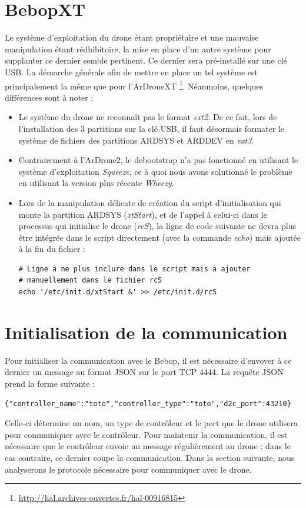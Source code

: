 \documentclass[12pt, openany]{report}
\begin{document}
\section{BebopXT}
Le système d'exploitation du drone étant propriétaire et une mauvaise manipulation étant rédhibitoire, la mise en place d'un autre système pour supplanter ce dernier semble pertinent. Ce dernier sera pré-installé sur une clé USB. 
La démarche générale afin de mettre en place un tel système est principalement la même que pour l'ArDroneXT \footnote{\url{http://hal.archives-ouvertes.fr/hal-00916815}}. Néanmoins, quelques différences sont à noter :
\begin{itemize}
\item Le système du drone ne reconnaît pas le format \textit{ext2}. De ce fait, lors de l'installation des 3 partitions sur la clé USB, il faut désormais formater le système de fichiers des partitions ARDSYS et ARDDEV en \textit{ext3}.
\item Contrairement à l'ArDrone2, le debootstrap n'a pas fonctionné en utilisant le système d'exploitation \textit{Squeeze}, ce à quoi nous avons solutionné le problème en utilisant la version plus récente \textit{Wheezy}.
\item Lors de la manipulation délicate de création du script d'initialisation qui monte la partition ARDSYS (\textit{xtStart}), et de l'appel à celui-ci dans le processus qui initialise le drone (\textit{rcS}), la ligne de code suivante ne devra plus être intégrée dans le script directement (avec la commande \textit{echo}) mais ajoutée à la fin du fichier : 
\begin{lstlisting}[frame=single]
# Ligne a ne plus inclure dans le script mais a ajouter 
# manuellement dans le fichier rcS
echo '/etc/init.d/xtStart &' >> /etc/init.d/rcS  
\end{lstlisting}
\end{itemize}

\section{Initialisation de la communication}
Pour initialiser la communication avec le Bebop, il est nécessaire d'envoyer à ce dernier un message au format JSON sur le port TCP 4444.
La requête JSON prend la forme suivante :
\begin{verbatim}
{"controller_name":"toto","controller_type":"toto","d2c_port":43210}
\end{verbatim}
Celle-ci détermine un nom, un type de contrôleur et le port que le drone utilisera pour communiquer avec le contrôleur. Pour maintenir la communication, il est nécessaire que le contrôleur envoie un message régulièrement au drone ; dans le cas contraire, ce dernier coupe la communication. Dans la section suivante, nous analyserons le protocole nécessaire pour communiquer avec le drone. 
\end{document}
